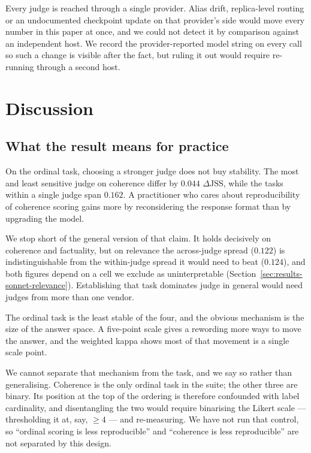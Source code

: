\documentclass[11pt]{article}          %
\begin{document}
Every judge is reached through a single provider. Alias drift, replica-level
routing or an undocumented checkpoint update on that provider's side would move
every number in this paper at once, and we could not detect it by comparison
against an independent host. We record the provider-reported model string on
every call so such a change is visible after the fact, but ruling it out would
require re-running through a second host.
\section{Discussion}
\label{sec:discussion}

\subsection{What the result means for practice}

On the ordinal task, choosing a stronger judge does not buy stability. The most
and least sensitive judge on coherence differ by $0.044$
$\Delta\mathrm{JSS}$, while the tasks within a single judge span $0.162$. A
practitioner who cares about reproducibility of coherence scoring gains more by
reconsidering the response format than by upgrading the model.

We stop short of the general version of that claim. It holds decisively on
coherence and factuality, but on relevance the across-judge spread ($0.122$) is
indistinguishable from the within-judge spread it would need to beat ($0.124$),
and both figures depend on a cell we exclude as uninterpretable
(Section~\ref{sec:results-sonnet-relevance}). Establishing that task dominates
judge in general would need judges from more than one vendor.

The ordinal task is the least stable of the four, and the obvious mechanism is
the size of the answer space. A five-point scale gives a rewording more ways to
move the answer, and the weighted kappa shows most of that movement is a single
scale point.

We cannot separate that mechanism from the task, and we say so rather than
generalising. Coherence is the only ordinal task in the suite; the other three
are binary. Its position at the top of the ordering is therefore confounded with
label cardinality, and disentangling the two would require binarising the Likert
scale --- thresholding it at, say, $\geq 4$ --- and re-measuring. We have not run
that control, so ``ordinal scoring is less reproducible'' and ``coherence is less
reproducible'' are not separated by this design.
\end{document}

